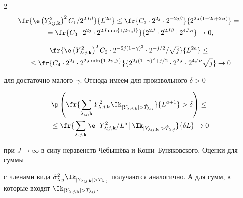 \begin{multicols}{2}
\begin{multline}


\label{eq_restEstimConsistTomo1}


\fr{\e \left(\Yljk^2\right)^2 C_1/2^{2J\beta}}{L^{2a}} \leq \fr{C_3\cdot 2^{2j}


\cdot 2^{-2j\beta}}{2^{2J(1-2c+2\varkappa)}} ={}\\


{}= \fr{C_3\cdot 2^{2j}\cdot2^{2J\min\left\{1, 2\upsilon, \beta\right\}}}{2^{2J}\cdot 2^{2J\beta}\cdot 2^{4J\varkappa}}  \rightarrow 0,


\end{multline}





\columnbreak 







\noindent


\begin{multline}


\fr{\e \left(\Yljk^2\right)^2 C_2\cdot 2^{-2j(1-\gamma)^2}\cdot 2^{-j/2}/\sqrt{j}}{L^{2a}} \leq {}\\


{}\leq


\fr{C_4\cdot 2^{2j}\cdot 2^{2J\min\left\{1, 2\upsilon, \beta\right\}}}{2^{2j(1-\gamma)^2+j/2}\cdot 2^{2J}\cdot 2^{4J\varkappa}\sqrt{j}} \rightarrow 0


\label{eq_restEstimConsistTomo2}


\end{multline}


для достаточно малого~$\gamma$. Отсюда имеем для произвольного $\delta>0$


\begin{multline*}


\p\left(\fr{\sumljk \Yljk^2 \indYjkghTj }{L^{a+1}}>\delta\right) \leq{}\\


{}\leq


\fr{\sumljk \e \left[\Yljk^2/L^a\right] \indYjkghTj  }{\delta L} \rightarrow 0


\end{multline*}


при $J\rightarrow\infty$ в силу неравенств Чебышёва и Коши--Бу\-ня\-ков\-ско\-го. Оценки для суммы 


с членами вида $\hslj \indYjkghTj$ получаются аналогично. А для сумм, в которые входят $\indYjkgTj$, 



\end{multicols}

